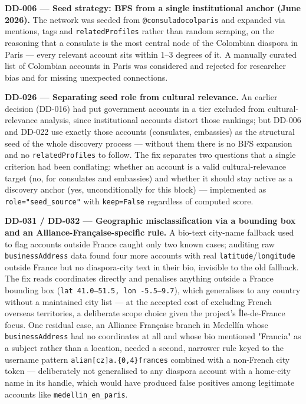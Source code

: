 \documentclass[12pt, a4paper]{report}
\begin{document}
\textbf{DD-006 --- Seed strategy: BFS from a single institutional
anchor (June 2026).} The network was seeded from \texttt{@consuladocolparis}
and expanded via mentions, tags and \texttt{relatedProfiles} rather than
random scraping, on the reasoning that a consulate is the most central
node of the Colombian diaspora in Paris — every relevant account sits
within 1--3 degrees of it. A manually curated list of Colombian accounts
in Paris was considered and rejected for researcher bias and for missing
unexpected connections.

\textbf{DD-026 --- Separating seed role from cultural relevance.} An
earlier decision (DD-016) had put government accounts in a tier excluded
from cultural-relevance analysis, since institutional accounts distort
those rankings; but DD-006 and DD-022 use
exactly those accounts (consulates, embassies) as the structural seed of
the whole discovery process — without them there is no BFS expansion and
no \texttt{relatedProfiles} to follow. The fix separates two questions
that a single criterion had been conflating: whether an account is a
valid cultural-relevance target (no, for consulates and embassies) and
whether it should stay active as a discovery anchor (yes, unconditionally
for this block) — implemented as \texttt{role="seed\_source"} with
\texttt{keep=False} regardless of computed score.

\textbf{DD-031 / DD-032 --- Geographic misclassification via a bounding
box and an Alliance-Française-specific rule.} A bio-text city-name
fallback used to flag accounts outside France caught only two known
cases; auditing raw \texttt{businessAddress} data found four more
accounts with real \texttt{latitude}/\texttt{longitude} outside France
but no diaspora-city text in their bio, invisible to the old fallback.
The fix reads coordinates directly and penalises anything outside a
France bounding box (\texttt{lat 41.0--51.5, lon -5.5--9.7}), which
generalises to any country without a maintained city list — at the
accepted cost of excluding French overseas territories, a deliberate
scope choice given the project's Île-de-France focus. One residual case,
an Alliance Française branch in Medellín whose \texttt{businessAddress}
had no coordinates at all and whose bio mentioned "Francia" as a subject
rather than a location, needed a second, narrower rule keyed to the
username pattern \texttt{alian[cz]a.\{0,4\}frances} combined with a
non-French city token — deliberately not generalised to any diaspora
account with a home-city name in its handle, which would have produced
false positives among legitimate accounts like
\texttt{medellin\_en\_paris}.
\end{document}
